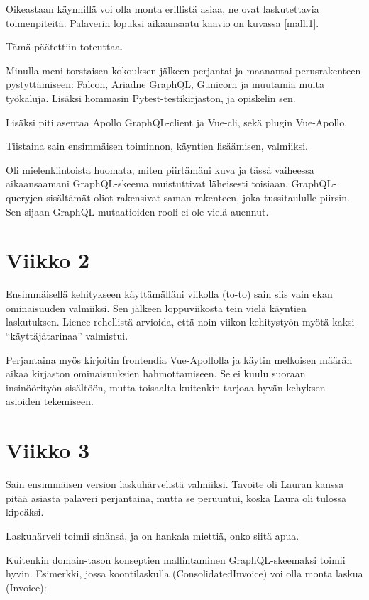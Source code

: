 Oikeastaan käynnillä voi olla monta erillistä asiaa, ne ovat
laskutettavia toimenpiteitä. Palaverin lopuksi aikaansaatu kaavio on
kuvassa \ref{malli1}.

Tämä päätettiin toteuttaa.

Minulla meni torstaisen kokouksen jälkeen perjantai ja maanantai
perusrakenteen pystyttämiseen: Falcon, Ariadne GraphQL, Gunicorn ja
muutamia muita työkaluja. Lisäksi hommasin Pytest-testikirjaston, ja
opiskelin sen.

Lisäksi piti asentaa Apollo GraphQL-client ja Vue-cli, sekä plugin
Vue-Apollo.

Tiistaina sain ensimmäisen toiminnon, käyntien lisäämisen, valmiiksi.

Oli mielenkiintoista huomata, miten piirtämäni kuva ja tässä vaiheessa
aikaansaamani GraphQL-skeema muistuttivat läheisesti toisiaan.
GraphQL-queryjen sisältämät oliot rakensivat saman rakenteen, joka
tussitaululle piirsin. Sen sijaan GraphQL-mutaatioiden rooli ei ole
vielä auennut.

\hypertarget{viikko-2}{%
\section{Viikko 2}\label{viikko-2}}

Ensimmäisellä kehitykseen käyttämälläni viikolla (to-to) sain siis vain
ekan ominaisuuden valmiiksi. Sen jälkeen loppuviikosta tein vielä
käyntien laskutuksen. Lienee rehellistä arvioida, että noin viikon
kehitystyön myötä kaksi ``käyttäjätarinaa'' valmistui.

Perjantaina myös kirjoitin frontendia Vue-Apollolla ja käytin melkoisen
määrän aikaa kirjaston ominaisuuksien hahmottamiseen. Se ei kuulu
suoraan insinöörityön sisältöön, mutta toisaalta kuitenkin tarjoaa hyvän
kehyksen asioiden tekemiseen.

\hypertarget{viikko-3}{%
\section{Viikko 3}\label{viikko-3}}

Sain ensimmäisen version laskuhärvelistä valmiiksi. Tavoite oli Lauran
kanssa pitää asiasta palaveri perjantaina, mutta se peruuntui, koska
Laura oli tulossa kipeäksi.

Laskuhärveli toimii sinänsä, ja on hankala miettiä, onko siitä apua.

Kuitenkin domain-tason konseptien mallintaminen GraphQL-skeemaksi toimii
hyvin. Esimerkki, jossa koontilaskulla (ConsolidatedInvoice) voi olla
monta laskua (Invoice):

